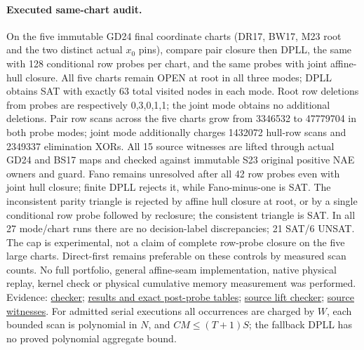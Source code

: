 \documentclass[11pt]{article}
\begin{document}
\paragraph{Executed same-chart audit.}
On the five immutable GD24 final coordinate charts (DR17, BW17, M23 root and the two distinct actual $x_0$ pins), compare pair closure then DPLL, the same with 128 conditional row probes per chart, and the same probes with joint affine-hull closure. All five charts remain OPEN at root in all three modes; DPLL obtains SAT with exactly 63 total visited nodes in each mode. Root row deletions from probes are respectively 0,3,0,1,1; the joint mode obtains no additional deletions. Pair row scans across the five charts grow from 3346532 to 47779704 in both probe modes; joint mode additionally charges 1432072 hull-row scans and 2349337 elimination XORs. All 15 source witnesses are lifted through actual GD24 and BS17 maps and checked against immutable S23 original positive NAE owners and guard. Fano remains unresolved after all 42 row probes even with joint hull closure; finite DPLL rejects it, while Fano-minus-one is SAT. The inconsistent parity triangle is rejected by affine hull closure at root, or by a single conditional row probe followed by reclosure; the consistent triangle is SAT. In all 27 mode/chart runs there are no decision-label discrepancies; 21 SAT/6 UNSAT. The cap is experimental, not a claim of complete row-probe closure on the five large charts. Direct-first remains preferable on these controls by measured scan counts. No full portfolio, general affine-seam implementation, native physical replay, kernel check or physical cumulative memory measurement was performed.
Evidence: \href{https://github.com/j15marti/pnp/commit/dfa9bfa0c5d67210bac83d93f6c0a150299c1f98}{checker}; \href{https://github.com/j15marti/pnp/commit/c9c31c7b9f3d1593c9bdc25e130d769968e07815}{results and exact post-probe tables}; \href{https://github.com/j15marti/pnp/commit/a005d1c10c2b3541df79dff73224ae2ee9eba095}{source lift checker}; \href{https://github.com/j15marti/pnp/commit/7bf620d7a250a019ab3ce77adf5b8222683c496c}{source witnesses}. For admitted serial executions all occurrences are charged by $W$, each bounded scan is polynomial in $N$, and $CM\le(T+1)S$; the fallback DPLL has no proved polynomial aggregate bound.
\end{document}
